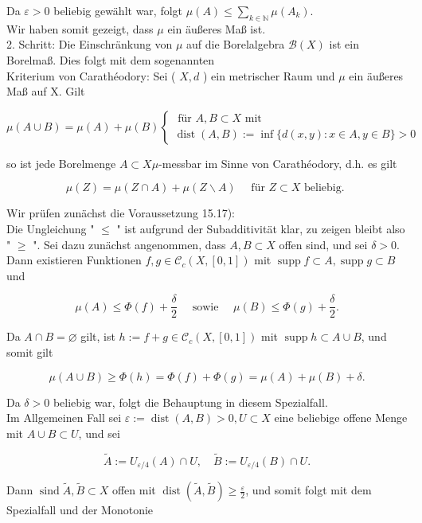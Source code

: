 \documentclass[10pt, letterpaper]{article}
\begin{document}
Da $\varepsilon>0$ beliebig gewählt war, folgt $\mu(A) \leq \sum_{k \in \mathbb{N}} \mu\left(A_{k}\right)$.\\
Wir haben somit gezeigt, dass $\mu$ ein äußeres Maß ist.\\
2. Schritt: Die Einschränkung von $\mu$ auf die Borelalgebra $\mathcal{B}(X)$ ist ein Borelmaß. Dies folgt mit dem sogenannten\\
Kriterium von Carathéodory: Sei ( $X, d$ ) ein metrischer Raum und $\mu$ ein äußeres Maß auf X. Gilt

$$
\mu(A \cup B)=\mu(A)+\mu(B)\left\{\begin{array}{l}
\text { für } A, B \subset X \text { mit } \\
\operatorname{dist}(A, B):=\inf \{d(x, y): x \in A, y \in B\}>0
\end{array}\right.
$$

so ist jede Borelmenge $A \subset X \mu$-messbar im Sinne von Carathéodory, d.h. es gilt

$$
\mu(Z)=\mu(Z \cap A)+\mu(Z \backslash A) \quad \text { für } Z \subset X \text { beliebig. }
$$

Wir prüfen zunächst die Voraussetzung 15.17):\\
Die Ungleichung " $\leq$ " ist aufgrund der Subadditivität klar, zu zeigen bleibt also " $\geq$ ". Sei dazu zunächst angenommen, dass $A, B \subset X$ offen sind, und sei $\delta>0$. Dann existieren Funktionen $f, g \in \mathcal{C}_{c}(X,[0,1])$ mit $\operatorname{supp} f \subset A, \operatorname{supp} g \subset B$ und

$$
\mu(A) \leq \Phi(f)+\frac{\delta}{2} \quad \text { sowie } \quad \mu(B) \leq \Phi(g)+\frac{\delta}{2} .
$$

Da $A \cap B=\varnothing$ gilt, ist $h:=f+g \in \mathcal{C}_{c}(X,[0,1])$ mit $\operatorname{supp} h \subset A \cup B$, und somit gilt

$$
\mu(A \cup B) \geq \Phi(h)=\Phi(f)+\Phi(g)=\mu(A)+\mu(B)+\delta .
$$

Da $\delta>0$ beliebig war, folgt die Behauptung in diesem Spezialfall.\\
Im Allgemeinen Fall sei $\varepsilon:=\operatorname{dist}(A, B)>0, U \subset X$ eine beliebige offene Menge mit $A \cup B \subset U$, und sei

$$
\tilde{A}:=U_{\varepsilon / 4}(A) \cap U, \quad \tilde{B}:=U_{\varepsilon / 4}(B) \cap U .
$$

Dann $\operatorname{sind} \tilde{A}, \tilde{B} \subset X$ offen mit $\operatorname{dist}(\tilde{A}, \tilde{B}) \geq \frac{\varepsilon}{2}$, und somit folgt mit dem Spezialfall und der Monotonie
\end{document}
